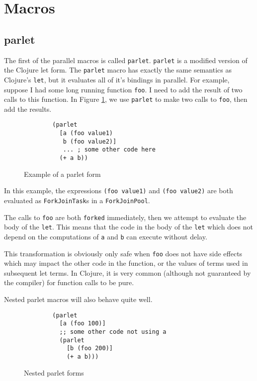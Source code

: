 \documentclass{sig-alternate}
\def\mintcode#1{\mbox{\texttt{#1}}}
\def\code#1{\mbox{\texttt{#1}}}
\def\parlet{\code{parlet}}
\begin{document}

\section{Macros}
\subsection{parlet}
The first of the parallel macros is called \parlet{}.
\parlet{} is a modified version of the Clojure let form.
The \parlet{} macro has exactly the same semantics as Clojure's \code{let}, but it evaluates all of it's bindings in parallel.
For example, suppose I had some long running function \code{foo}.
I need to add the result of two calls to this function.
In Figure \ref{fig:parlet_basic}, we use \parlet{} to make two calls to \code{foo}, then add the results.

\begin{figure}[h]
    \begin{verbatim}
        (parlet
          [a (foo value1)
           b (foo value2)]
           ... ; some other code here
          (+ a b))
    \end{verbatim}
    \caption{Example of a parlet form}
    \label{fig:parlet_basic}
\end{figure}

In this example, the expressions \mintcode{(foo value1)} and \mintcode{(foo value2)} are both evaluated as \code{ForkJoinTask}s in a \code{ForkJoinPool}\cite{Lea2000}.

The calls to \code{foo} are both \code{forked} immediately, then we attempt to evaluate the body of the \code{let}.
This means that the code in the body of the \code{let} which does not depend on the computations of \code{a} and \code{b} can execute without delay.

This transformation is obviously only safe when \code{foo} does not have side effects which may impact the other code in the function, or the values of terms used in subsequent let terms.
In Clojure, it is very common (although not guaranteed by the compiler) for function calls to be pure.

Nested parlet macros will also behave quite well.

\begin{figure}[h]
    \begin{verbatim}
        (parlet
          [a (foo 100)]
          ;; some other code not using a
          (parlet
            [b (foo 200)]
            (+ a b)))
    \end{verbatim}
    \caption{Nested parlet forms}
    \label{fig:parlet_noblock}
\end{figure}
\end{document}

